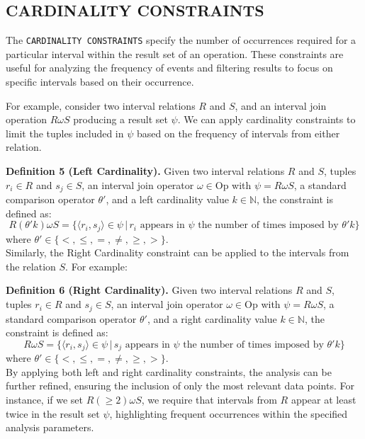 \documentclass{article}
\begin{document}
\subsection{CARDINALITY CONSTRAINTS}

The \texttt{CARDINALITY CONSTRAINTS} specify the number of occurrences required for a particular interval within the result set of an operation. These constraints are useful for analyzing the frequency of events and filtering results to focus on specific intervals based on their occurrence.

For example, consider two interval relations \(R\) and \(S\), and an interval join operation \(R \omega S\) producing a result set \(\psi\). We can apply cardinality constraints to limit the tuples included in \(\psi\) based on the frequency of intervals from either relation.

\textbf{Definition 5 (Left Cardinality).} Given two interval relations \(R\) and \(S\), tuples \(r_i \in R\) and \(s_j \in S\), an interval join operator \(\omega \in \text{Op}\) with \(\psi = R \omega S\), a standard comparison operator \(\theta'\), and a left cardinality value \(k \in \mathbb{N}\), the constraint is defined as:
\[
R (\theta' k) \omega S = \{\langle r_i, s_j \rangle \in \psi \,|\, r_i \text{ appears in } \psi \text{ the number of times imposed by } \theta' k\}
\]
where \(\theta' \in \{<, \leq, =, \neq, \geq, >\}\).\\



Similarly, the Right Cardinality constraint can be applied to the intervals from the relation \(S\). For example:

\textbf{Definition 6 (Right Cardinality).} Given two interval relations \(R\) and \(S\), tuples \(r_i \in R\) and \(s_j \in S\), an interval join operator \(\omega \in \text{Op}\) with \(\psi = R \omega S\), a standard comparison operator \(\theta'\), and a right cardinality value \(k \in \mathbb{N}\), the constraint is defined as:
\[
R \omega S = \{\langle r_i, s_j \rangle \in \psi \,|\, s_j \text{ appears in } \psi \text{ the number of times imposed by } \theta' k\}
\]
where \(\theta' \in \{<, \leq, =, \neq, \geq, >\}\).\\

By applying both left and right cardinality constraints, the analysis can be further refined, ensuring the inclusion of only the most relevant data points. For instance, if we set \(R (\geq 2) \omega S\), we require that intervals from \(R\) appear at least twice in the result set \(\psi\), highlighting frequent occurrences within the specified analysis parameters.
\end{document}
